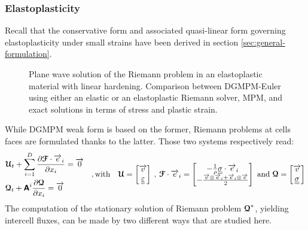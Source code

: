

\subsubsection{Elastoplasticity}
Recall that the conservative form and associated quasi-linear form governing elastoplasticity under small strains have been derived in section \ref{sec:general-formulation}.
\begin{figure}[h!]
  \centering
  { \label{subfig:ep_dgmpm_mpm1}}
  { \label{subfig:ep_dgmpm_mpm3}}
  {}
  \caption{Plane wave solution of the Riemann problem in an elastoplastic material with linear hardening. Comparison between DGMPM-Euler using either an elastic or an elastoplastic Riemann solver, MPM, and exact solutions in terms of stress and plastic strain.}
  \label{fig:RP_EP_dgmpm_mpm}
\end{figure}
While DGMPM weak form is based on the former, Riemann problems at cells faces are formulated thanks to the latter. Those two systems respectively read:
\begin{equation*}
  \begin{aligned}
  & {\boldsymbol{\mathcal{U}}}_t + \sum_{i=1}^D \frac{\partial {\boldsymbol{\mathcal{F}}}\cdot {\overrightarrow{e}}_i}{\partial x_i} = {\overrightarrow{0}} \\
  & {\boldsymbol{\mathcal{Q}}}_t + \boldsymbol{\mathsf{A}}^i \frac{\partial {\boldsymbol{\mathcal{Q}}}}{\partial x_i} = {\overrightarrow{0}}
  \end{aligned} \quad,\text{with}\quad {\boldsymbol{\mathcal{U}}} =\left[\begin{matrix}{\overrightarrow{v}} \\ {\underline{\underline{\varepsilon}}}\end{matrix}\right] \:,\: {\boldsymbol{\mathcal{F}}}\cdot{\overrightarrow{e}}_i = \left[\begin{matrix}-\frac{1}{\rho}{\underline{\underline{\sigma}}}\cdot{\overrightarrow{e}}_i\\-\frac{{\overrightarrow{v}}\otimes{\overrightarrow{e}}_i +{\overrightarrow{e}}_i \otimes{\overrightarrow{v}} }{2} \end{matrix}\right] \text{ and } {\boldsymbol{\mathcal{Q}}}=\left[\begin{matrix}{\overrightarrow{v}}\\ {\underline{\underline{\sigma}}}\end{matrix}\right]
\end{equation*}
The computation of the stationary solution of Riemann problem ${\boldsymbol{\mathcal{Q}}}^*$, yielding intercell fluxes, can be made by two different ways that are studied here.
